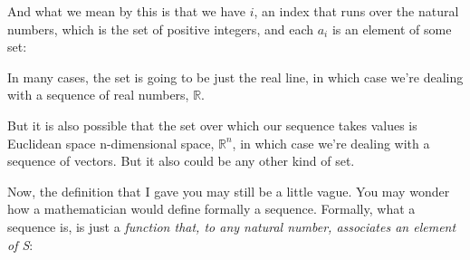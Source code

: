 \documentclass[pdftex, brazil, 12pt, twoside]{article}
\begin{document}
And what we mean by this is that we have $i$, an index that
runs over the natural numbers, which is the set of positive
integers, and each $a_i$ is an element of some set:

\begin{figure}[H]
  \begin{center}
  \end{center}
\end{figure}

In many cases, the set is going to be just the real
line, in which case we're dealing with a sequence of
real numbers, $\mathbb{R}$.

But it is also possible that the set over which our
sequence takes values is Euclidean space n-dimensional
space, $\mathbb{R}^n$, in which case we're dealing with
a sequence of vectors.
But it also could be any other kind of set.

\begin{figure}[H]
  \begin{center}
  \end{center}
\end{figure}

Now, the definition that I gave you may
still be a little vague.
You may wonder how a mathematician would define
formally a sequence.
Formally, what a sequence is, is just a \emph{function that, to
  any natural number, associates an element of S}:

\begin{figure}[H]
  \begin{center}
  \end{center}
\end{figure}
\end{document}
